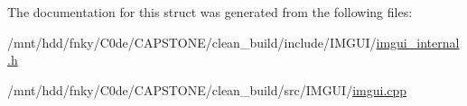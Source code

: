 The documentation for this struct was generated from the following files\+:\begin{DoxyCompactItemize}
\item 
/mnt/hdd/fnky/\+C0de/\+C\+A\+P\+S\+T\+O\+N\+E/clean\+\_\+build/include/\+I\+M\+G\+U\+I/\hyperlink{imgui__internal_8h}{imgui\+\_\+internal.\+h}\item 
/mnt/hdd/fnky/\+C0de/\+C\+A\+P\+S\+T\+O\+N\+E/clean\+\_\+build/src/\+I\+M\+G\+U\+I/\hyperlink{imgui_8cpp}{imgui.\+cpp}\end{DoxyCompactItemize}
